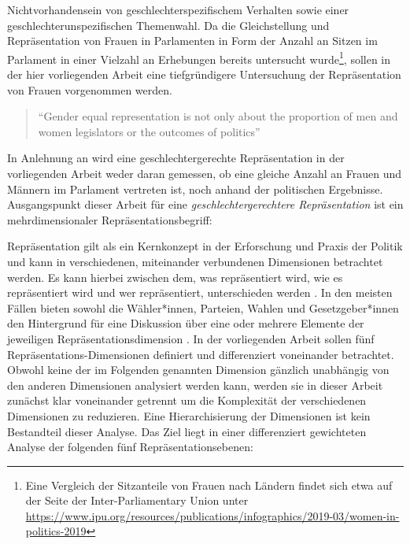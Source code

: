 \documentclass[12pt, 
    twoside=false, 
    bibliography=totoc, 
    numbers=endperiod, 
    headings=normal, 
    toc=chapterentrydotfill
    ]{scrbook}
\begin{document}
Nichtvorhandensein von geschlechterspezifischem Verhalten sowie einer geschlechterunspezifischen Themenwahl. Da die Gleichstellung und Repräsentation von Frauen in Parlamenten in Form der Anzahl an Sitzen im Parlament in einer Vielzahl an Erhebungen bereits untersucht wurde\footnote{Eine Vergleich der Sitzanteile von Frauen nach Ländern findet sich etwa auf der Seite der Inter-Parliamentary Union unter \url{https://www.ipu.org/resources/publications/infographics/2019-03/women-in-politics-2019}}, sollen in der hier vorliegenden Arbeit eine tiefgründigere Untersuchung der Repräsentation von Frauen vorgenommen werden. 

\citereset
\begin{quote}
     \enquote{Gender equal representation is not only about the proportion of men and women legislators or the outcomes of politics}\parencite[197]{erikson_2018}
 \end{quote}

In Anlehnung an \textcite{erikson_2018} wird eine geschlechtergerechte Repräsentation in der vorliegenden Arbeit weder daran gemessen, ob eine gleiche Anzahl an Frauen und Männern im Parlament vertreten ist, noch anhand der politischen Ergebnisse. Ausgangspunkt dieser Arbeit für eine \emph{geschlechtergerechtere Repräsentation} ist ein mehrdimensionaler Repräsentationsbegriff:

Repräsentation gilt als ein Kernkonzept in der Erforschung und Praxis der Politik und kann in verschiedenen, miteinander verbundenen Dimensionen betrachtet werden. Es kann hierbei zwischen dem, was repräsentiert wird, wie es repräsentiert wird und wer repräsentiert, unterschieden werden \parencite[557]{galligan_2007}. In den meisten Fällen bieten sowohl die Wähler*innen, Parteien, Wahlen und Gesetzgeber*innen den Hintergrund für eine Diskussion über eine oder mehrere Elemente der jeweiligen Repräsentationsdimension \parencite[557]{galligan_2007}.
In der vorliegenden Arbeit sollen fünf Repräsentations-Dimensionen definiert und differenziert voneinander betrachtet. Obwohl keine der im Folgenden genannten Dimension gänzlich unabhängig von den anderen Dimensionen analysiert werden kann, werden sie in dieser Arbeit zunächst klar voneinander getrennt um die Komplexität der verschiedenen Dimensionen zu reduzieren. Eine Hierarchisierung der Dimensionen ist kein Bestandteil dieser Analyse. Das Ziel liegt in einer differenziert gewichteten Analyse der folgenden fünf Repräsentationsebenen:
\end{document}
